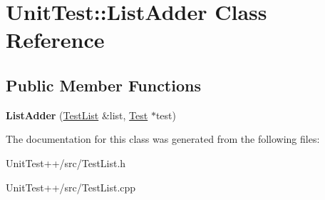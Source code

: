 \hypertarget{classUnitTest_1_1ListAdder}{\section{Unit\-Test\-:\-:List\-Adder Class Reference}
\label{classUnitTest_1_1ListAdder}
}
\subsection*{Public Member Functions}
\begin{DoxyCompactItemize}
\item 
\hypertarget{classUnitTest_1_1ListAdder_ae63020bfcaf6810089821af0f5cedc9a}{{\bfseries List\-Adder} (\hyperlink{classUnitTest_1_1TestList}{Test\-List} \&list, \hyperlink{classUnitTest_1_1Test}{Test} $\ast$test)}\label{classUnitTest_1_1ListAdder_ae63020bfcaf6810089821af0f5cedc9a}

\end{DoxyCompactItemize}


The documentation for this class was generated from the following files\-:\begin{DoxyCompactItemize}
\item 
Unit\-Test++/src/Test\-List.\-h\item 
Unit\-Test++/src/Test\-List.\-cpp\end{DoxyCompactItemize}
